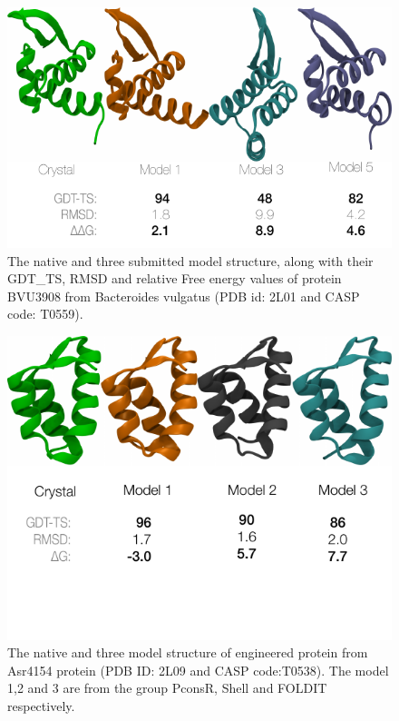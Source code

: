 \documentclass[12pt]{article}
\begin{document}

\begin{figure}
\begin{center}
\includegraphics[width=3.8 in,height=3.0 in]{T0559.pdf}
\end{center}
\caption{The native and three submitted model structure, along with their GDT\_TS, RMSD and relative Free energy values 
of protein BVU3908 from Bacteroides vulgatus (PDB id: 2L01 and CASP code: T0559).}
\label{fig:T0559}
\end{figure}

\begin{figure}
\begin{center}
\includegraphics[width=3.8 in,height=3.0 in]{T0538.pdf}
\end{center}
\caption{The native and three model structure of engineered protein from Asr4154 protein (PDB ID: 2L09 and CASP code:T0538). The model 1,2 and 3 are
from the group PconsR, Shell and FOLDIT respectively.}
\label{fig:T0538}
\end{figure}
\end{document}
